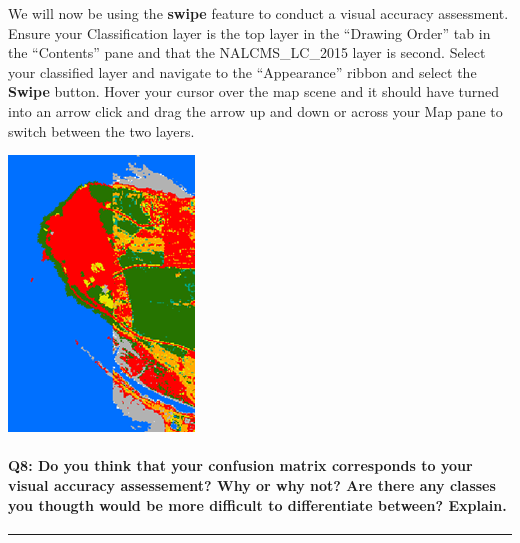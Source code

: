\documentclass[
]{book}
\begin{document}
We will now be using the \textbf{swipe} feature to conduct a visual accuracy assessment. Ensure your Classification layer is the top layer in the ``Drawing Order'' tab in the ``Contents'' pane and that the NALCMS\_LC\_2015 layer is second. Select your classified layer and navigate to the ``Appearance'' ribbon and select the \textbf{Swipe} button. Hover your cursor over the map scene and it should have turned into an arrow click and drag the arrow up and down or across your Map pane to switch between the two layers.

\begin{center}\includegraphics[width=0.3\linewidth]{images/08-visual-accuracy-assessment} \end{center}

\hypertarget{q8-do-you-think-that-your-confusion-matrix-corresponds-to-your-visual-accuracy-assessement-why-or-why-not-are-there-any-classes-you-thougth-would-be-more-difficult-to-differentiate-between-explain.}{%
\paragraph*{Q8: Do you think that your confusion matrix corresponds to your visual accuracy assessement? Why or why not? Are there any classes you thougth would be more difficult to differentiate between? Explain.}\label{q8-do-you-think-that-your-confusion-matrix-corresponds-to-your-visual-accuracy-assessement-why-or-why-not-are-there-any-classes-you-thougth-would-be-more-difficult-to-differentiate-between-explain.}}

\begin{center}\rule{0.5\linewidth}{0.5pt}\end{center}
\end{document}
